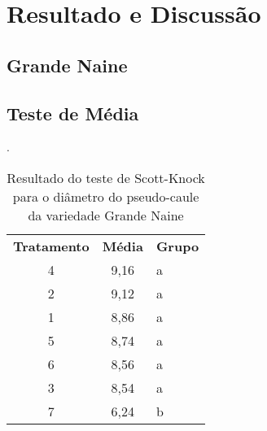 \chapter{Resultado e Discussão}
\section{Grande Naine}

\section{Teste de Média}
  
 
\begin{table}[!htb]
 	\begin{center}
 		\caption{Resultado do teste de Scott-Knock para o diâmetro do pseudo-caule da variedade Grande Naine}.
	 	\begin{tabular}{ccp{9cm}}
 		\hline
 		\hline
 		\textbf{Tratamento} & \textbf{Média}  & \textbf{Grupo}\\
 		4 & 9,16 & a \\
 		2 & 9,12 & a \\
 		1 & 8,86 & a \\
 		5 & 8,74 & a \\
 		6 & 8,56  & a \\
 		3 & 8,54  & a \\
 		7 & 6,24   & b \\
		\hline
		\hline
 		\end{tabular}\\
 	\end{center}
\end{table}